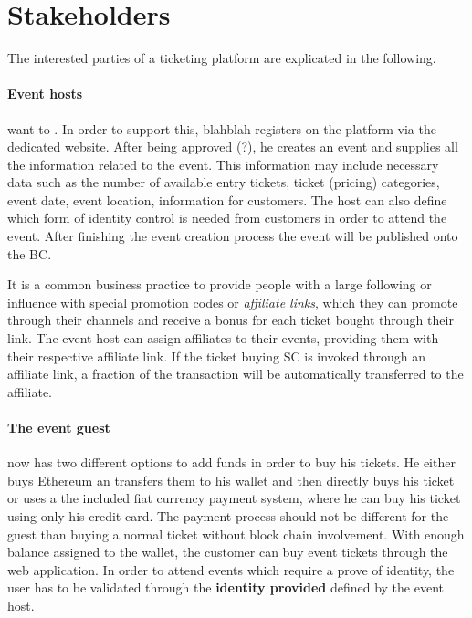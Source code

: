 \section{Stakeholders}
The interested parties of a ticketing platform are explicated in the following.

\paragraph{Event hosts} want to . In order to support this, blahblah
registers on the platform via the dedicated website. After being approved (?), he creates an event and supplies all the information related to the event. This information may include necessary data such as the number of available entry tickets, ticket (pricing) categories, event date, event location, information for customers. The host can also define which form of identity control is needed from customers in order to attend the event. After finishing the event creation process the event will be published onto the BC.

It is a common business practice to provide people with a large following or influence with special promotion codes or \textit{affiliate links}, which they can promote through their channels and receive a bonus for each ticket bought through their link. The event host can assign affiliates to their events, providing them with their respective affiliate link. If the ticket buying SC is invoked through an affiliate link, a fraction of the transaction will be automatically transferred to the affiliate.  

\paragraph{The event guest} %
now has two different options to add funds in order to buy his tickets. He either buys Ethereum an transfers them to his wallet and then directly buys his ticket or uses a the included fiat currency payment system, where he can buy his ticket using only his credit card.
The payment process should not be different for the guest than buying a normal ticket without block chain involvement.
With enough balance assigned to the wallet, the customer can buy event tickets through the web application.
In order to attend events which require a prove of identity, the user has to be validated through the \textbf{identity provided} defined by the event host.

